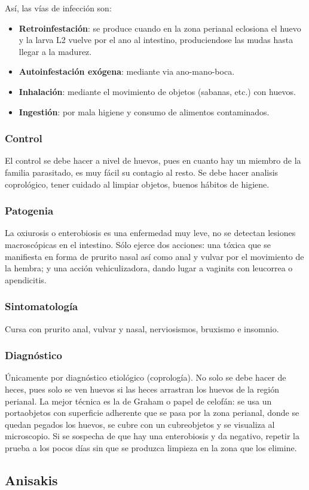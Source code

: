 Así, las vías de infección son:
\begin{itemize}[itemsep=0pt,parsep=0pt,topsep=0pt,partopsep=0pt]
	\item\textbf{Retroinfestación}: se produce cuando en la zona perianal eclosiona el huevo y la larva L2 vuelve por el ano al intestino, produciendose las mudas hasta llegar a la madurez.
	\item\textbf{Autoinfestación exógena}: mediante via ano-mano-boca.
	\item\textbf{Inhalación}: mediante el movimiento de objetos (sabanas, etc.) con huevos.
	\item\textbf{Ingestión}: por mala higiene y consumo de alimentos contaminados.
\end{itemize}
\subsubsection{Control}
El control se debe hacer a nivel de huevos, pues en cuanto hay un miembro de la familia parasitado, es muy fácil su contagio al resto. Se debe hacer analisis coprológico, tener cuidado al limpiar objetos, buenos hábitos de higiene.
\subsubsection{Patogenia}
La oxiurosis o enterobiosis es una enfermedad muy leve, no se detectan lesiones macroscópicas en el intestino. Sólo ejerce dos acciones: una tóxica que se manifiesta en forma de prurito nasal así como anal y vulvar por el movimiento de la hembra; y una acción vehiculizadora, dando lugar a vaginits con leucorrea o apendicitis.
\subsubsection{Sintomatología}
Cursa con prurito anal, vulvar y nasal, nerviosismos, bruxismo e insomnio.
\subsubsection{Diagnóstico}
Únicamente por diagnóstico etiológico (coprología). No solo se debe hacer de heces, pues solo se ven huevos si las heces arrastran los huevos de la región perianal. La mejor técnica es la de Graham o papel de celofán: se usa un portaobjetos con superficie adherente que se pasa por la zona perianal, donde se quedan pegados los huevos, se cubre con un cubreobjetos y se visualiza al microscopio. Si se sospecha de que hay una enterobiosis y da negativo, repetir la prueba a los pocos días sin que se produzca  limpieza en la zona que los elimine.
\newpage
\subsection{Anisakis}